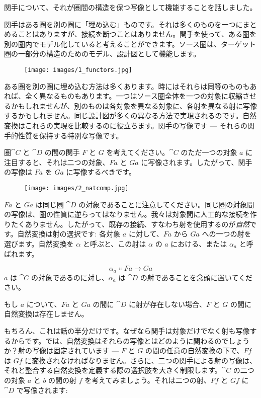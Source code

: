 
\lettrine[lhang=0.17]{関}{手}について、それが圏間の構造を保つ写像として機能することを話しました。

関手はある圏を別の圏に「埋め込む」ものです。それは多くのものを一つにまとめることはありますが、接続を断つことはありません。関手を使って、ある圏を別の圏内でモデル化していると考えることができます。ソース圏は、ターゲット圏の一部分の構造のためのモデル、設計図として機能します。

\begin{figure}[H]
  \centering\texttt{[image: images/1\_functors.jpg]}
\end{figure}

\noindent
ある圏を別の圏に埋め込む方法は多くあります。時にはそれらは同等のものもあれば、全く異なるものもあります。一つはソース圏全体を一つの対象に収縮させるかもしれませんが、別のものは各対象を異なる対象に、各射を異なる射に写像するかもしれません。同じ設計図が多くの異なる方法で実現されるのです。自然変換はこれらの実現を比較するのに役立ちます。関手の写像です --- それらの関手的性質を保持する特別な写像です。

圏$\cat{C}$ と $\cat{D}$ の間の関手 $F$ と $G$ を考えてください。$\cat{C}$ のただ一つの対象 $a$ に注目すると、それは二つの対象、$F a$ と $G a$ に写像されます。したがって、関手の写像は $F a$ を $G a$ に写像するべきです。

\begin{figure}[H]
  \centering
  \texttt{[image: images/2\_natcomp.jpg]}
\end{figure}

\noindent
$F a$ と $G a$ は同じ圏 $\cat{D}$ の対象であることに注意してください。同じ圏の対象間の写像は、圏の性質に逆らってはなりません。我々は対象間に人工的な接続を作りたくありません。したがって、既存の接続、すなわち射を使用するのが\emph{自然}です。自然変換は射の選択です: 各対象 $a$ に対して、$F a$ から $G a$ への一つの射を選びます。自然変換を $\alpha$ と呼ぶと、この射は $\alpha$ の $a$ における、または $\alpha_a$ と呼ばれます。

\[\alpha_a \Colon F a \to G a\]
$a$ は $\cat{C}$ の対象であるのに対し、$\alpha_a$ は $\cat{D}$ の射であることを念頭に置いてください。

もし $a$ について、$F a$ と $G a$ の間に $\cat{D}$ に射が存在しない場合、$F$ と $G$ の間に自然変換は存在しません。

もちろん、これは話の半分だけです。なぜなら関手は対象だけでなく射も写像するからです。では、自然変換はそれらの写像とはどのように関わるのでしょうか？射の写像は固定されています --- $F$ と $G$ の間の任意の自然変換の下で、$F f$ は $G f$ に変換されなければなりません。さらに、二つの関手による射の写像は、それと整合する自然変換を定義する際の選択肢を大きく制限します。$\cat{C}$ の二つの対象 $a$ と $b$ の間の射 $f$ を考えてみましょう。それは二つの射、$F f$ と $G f$ に $\cat{D}$ で写像されます: 


